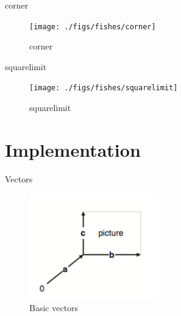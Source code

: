 \documentclass{beamer}
\begin{document}
%
%
%
%
%

    \begin{frame}{corner}

        \begin{figure}
            \centering
            \texttt{[image: ./figs/fishes/corner]}
            \caption{corner}
            \label{fig:corner}
        \end{figure}

    \end{frame}

    \begin{frame}{squarelimit}

        \begin{figure}
            \centering
            \texttt{[image: ./figs/fishes/squarelimit]}
            \caption{squarelimit}
            \label{fig:squarelimit}
        \end{figure}

    \end{frame}

    \section{Implementation}

    \begin{frame}{Vectors}
        \begin{figure}
            \centering
            \includegraphics[width=0.5\textwidth]{./figs/vectors}
            \caption{Basic vectors}
            \label{fig:vectors}
        \end{figure}
    \end{frame}
\end{document}
